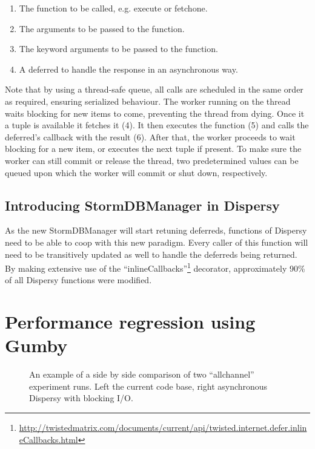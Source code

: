 \begin{enumerate}
	\item The function to be called, e.g. execute or fetchone.
	\item The arguments to be passed to the function.
	\item The keyword arguments to be passed to the function.
	\item A deferred to handle the response in an asynchronous way.
\end{enumerate}

Note that by using a thread-safe queue, all calls are scheduled in the same order as required, ensuring serialized behaviour.
The worker running on the thread waits blocking for new items to come, preventing the thread from dying.
Once it a tuple is available it fetches it (4).
It then executes the function (5) and calls the deferred's callback with the result (6).
After that, the worker proceeds to wait blocking for a new item, or executes the next tuple if present.
To make sure the worker can still commit or release the thread, two predetermined values can be queued upon which the worker will commit or shut down, respectively.

\subsection{Introducing StormDBManager in Dispersy}

As the new StormDBManager will start retuning deferreds, functions of Dispersy need to be able to coop with this new paradigm.
Every caller of this function will need to be transitively updated as well to handle the deferreds being returned.
By making extensive use of the \enquote{inlineCallbacks}\footnote{\url{http://twistedmatrix.com/documents/current/api/twisted.internet.defer.inlineCallbacks.html}} decorator, approximately 90\% of all Dispersy functions were modified. 

\section{Performance regression using Gumby}

\begin{figure}[h]
	\caption{An example of a side by side comparison of two \enquote{allchannel} experiment runs. Left the current code base, right asynchronous Dispersy with blocking I/O.}
	\label{fig:side_by_side_send}
\end{figure} 

